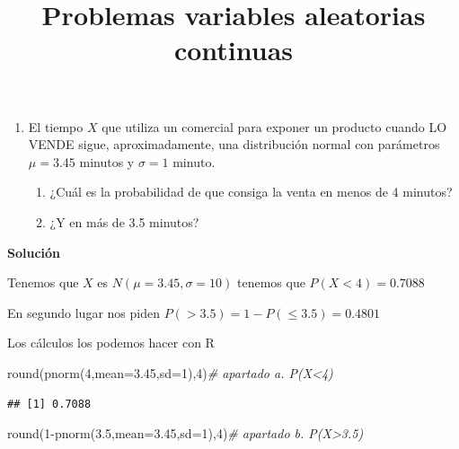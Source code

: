 \documentclass[
]{article}
\title{Problemas variables aleatorias continuas}
\author{}
\date{\vspace{-2.5em}}
\newenvironment{Shaded}{\begin{snugshade}}{\end{snugshade}}
\newcommand{\AttributeTok}[1]{\textcolor[rgb]{0.77,0.63,0.00}{#1}}
\newcommand{\CommentTok}[1]{\textcolor[rgb]{0.56,0.35,0.01}{\textit{#1}}}
\newcommand{\DecValTok}[1]{\textcolor[rgb]{0.00,0.00,0.81}{#1}}
\newcommand{\FloatTok}[1]{\textcolor[rgb]{0.00,0.00,0.81}{#1}}
\newcommand{\FunctionTok}[1]{\textcolor[rgb]{0.00,0.00,0.00}{#1}}
\newcommand{\NormalTok}[1]{#1}
\newcommand{\SpecialCharTok}[1]{\textcolor[rgb]{0.00,0.00,0.00}{#1}}
\providecommand{\tightlist}{%
  \setlength{\itemsep}{0pt}\setlength{\parskip}{0pt}}
\begin{document}
\maketitle

\begin{enumerate}
\def\labelenumi{\arabic{enumi}.}
\tightlist
\item
  El tiempo \(X\) que utiliza un comercial para exponer un producto
  cuando LO VENDE sigue, aproximadamente, una distribución normal con
  parámetros \(\mu =3.45\) minutos y \(\sigma = 1\) minuto.

  \begin{enumerate}
  \def\labelenumii{\alph{enumii}.}
  \tightlist
  \item
    ¿Cuál es la probabilidad de que consiga la venta en menos de 4
    minutos?\\
  \item
    ¿Y en más de 3.5 minutos?
  \end{enumerate}
\end{enumerate}

\textbf{Solución}

Tenemos que \(X\) es \(N(\mu=3.45,\sigma=10)\) tenemos que
\(P(X <4)=0.7088\)

En segundo lugar nos piden \(P(>3.5)=1-P(\leq 3.5)=0.4801\)

Los cálculos los podemos hacer con R

\begin{Shaded}
\begin{Highlighting}[]
\FunctionTok{round}\NormalTok{(}\FunctionTok{pnorm}\NormalTok{(}\DecValTok{4}\NormalTok{,}\AttributeTok{mean=}\FloatTok{3.45}\NormalTok{,}\AttributeTok{sd=}\DecValTok{1}\NormalTok{),}\DecValTok{4}\NormalTok{)}\CommentTok{\# apartado a. P(X\textless{}4)}
\end{Highlighting}
\end{Shaded}

\begin{verbatim}
## [1] 0.7088
\end{verbatim}

\begin{Shaded}
\begin{Highlighting}[]
\FunctionTok{round}\NormalTok{(}\DecValTok{1}\SpecialCharTok{{-}}\FunctionTok{pnorm}\NormalTok{(}\FloatTok{3.5}\NormalTok{,}\AttributeTok{mean=}\FloatTok{3.45}\NormalTok{,}\AttributeTok{sd=}\DecValTok{1}\NormalTok{),}\DecValTok{4}\NormalTok{)}\CommentTok{\# apartado b. P(X\textgreater{}3.5)}
\end{Highlighting}
\end{Shaded}
\end{document}
